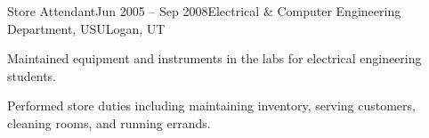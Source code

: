 
\def\PositionTitle{Store Attendant}
\def\PositionPeriod{Jun 2005 -- Sep 2008} %
\def\OrgName{Electrical \& Computer Engineering Department, USU}
\def\OrgLocation{Logan, UT}


\begin{rExperience}{\PositionTitle}{\PositionPeriod}{\OrgName}{\OrgLocation}

  \item Maintained equipment and instruments in the labs for electrical engineering students.

  \item Performed store duties including maintaining inventory, serving customers, cleaning rooms, and running errands.

\end{rExperience}
